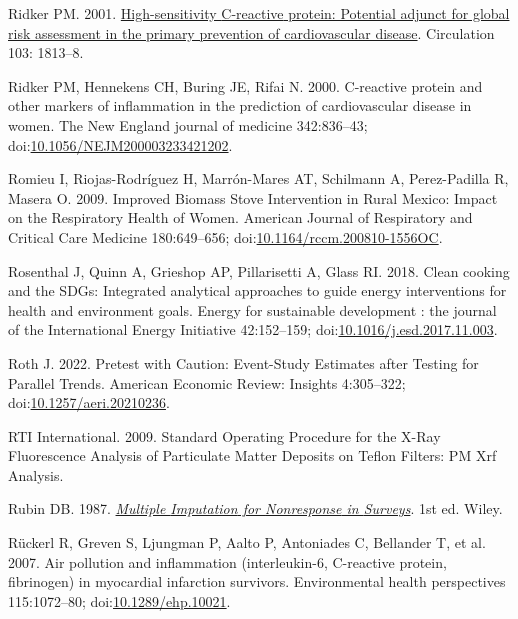 \documentclass[
  letterpaper,
  DIV=11,
  numbers=noendperiod]{scrartcl}
\newlength{\cslhangindent}
\newenvironment{CSLReferences}[2] %
 {\begin{list}{}{%
  \setlength{\itemindent}{0pt}
  \setlength{\leftmargin}{0pt}
  \setlength{\parsep}{0pt}
  \ifodd #1
   \setlength{\leftmargin}{\cslhangindent}
   \setlength{\itemindent}{-1\cslhangindent}
  \fi
  \setlength{\itemsep}{#2\baselineskip}}}
 {\end{list}}
\begin{document}
\begin{CSLReferences}{1}{1}
Ridker PM. 2001.
\href{https://www.ncbi.nlm.nih.gov/pubmed/11282915}{High-sensitivity
{C-reactive} protein: Potential adjunct for global risk assessment in
the primary prevention of cardiovascular disease}. Circulation 103:
1813--8.

Ridker PM, Hennekens CH, Buring JE, Rifai N. 2000. C-reactive protein
and other markers of inflammation in the prediction of cardiovascular
disease in women. The New England journal of medicine 342:836--43;
doi:\href{https://doi.org/10.1056/NEJM200003233421202}{10.1056/NEJM200003233421202}.

Romieu I, Riojas-Rodríguez H, Marrón-Mares AT, Schilmann A,
Perez-Padilla R, Masera O. 2009. Improved {Biomass Stove Intervention}
in {Rural Mexico}: {Impact} on the {Respiratory Health} of {Women}.
American Journal of Respiratory and Critical Care Medicine 180:649--656;
doi:\href{https://doi.org/10.1164/rccm.200810-1556OC}{10.1164/rccm.200810-1556OC}.

Rosenthal J, Quinn A, Grieshop AP, Pillarisetti A, Glass RI. 2018. Clean
cooking and the {SDGs}: {Integrated} analytical approaches to guide
energy interventions for health and environment goals. Energy for
sustainable development : the journal of the International Energy
Initiative 42:152--159;
doi:\href{https://doi.org/10.1016/j.esd.2017.11.003}{10.1016/j.esd.2017.11.003}.

Roth J. 2022. Pretest with {Caution}: {Event-Study Estimates} after
{Testing} for {Parallel Trends}. American Economic Review: Insights
4:305--322;
doi:\href{https://doi.org/10.1257/aeri.20210236}{10.1257/aeri.20210236}.

RTI International. 2009. Standard {Operating Procedure} for the {X-Ray
Fluorescence Analysis} of {Particulate Matter Deposits} on {Teflon
Filters}: {PM Xrf Analysis}.

Rubin DB. 1987.
\emph{\href{https://doi.org/10.1002/9780470316696}{Multiple {Imputation}
for {Nonresponse} in {Surveys}}}. 1st ed. Wiley.

Rückerl R, Greven S, Ljungman P, Aalto P, Antoniades C, Bellander T, et
al. 2007. Air pollution and inflammation (interleukin-6, {C-reactive}
protein, fibrinogen) in myocardial infarction survivors. Environmental
health perspectives 115:1072--80;
doi:\href{https://doi.org/10.1289/ehp.10021}{10.1289/ehp.10021}.


\end{CSLReferences}
\end{document}
